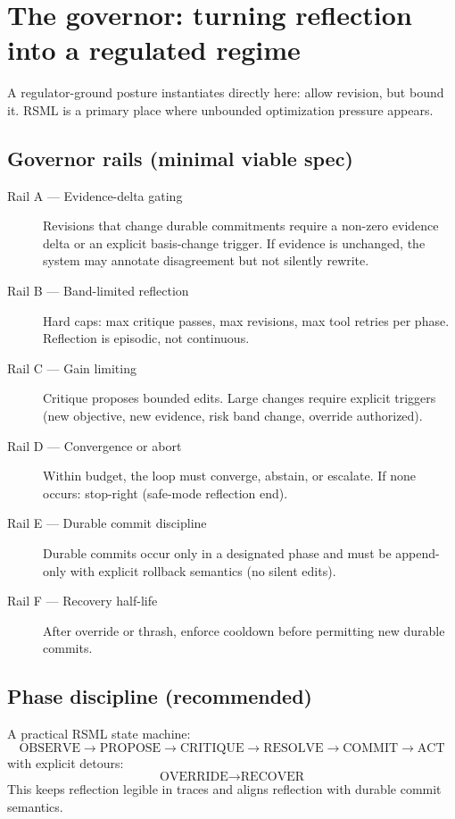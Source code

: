 \documentclass[11pt]{article}
\begin{document}
\section{The governor: turning reflection into a regulated regime}
A regulator-ground posture instantiates directly here: allow revision, but bound it. RSML is a primary place
where unbounded optimization pressure appears.

\subsection{Governor rails (minimal viable spec)}
\begin{description}
  \item[Rail A — Evidence-delta gating] Revisions that change durable commitments require a non-zero evidence delta or an explicit basis-change trigger. If evidence is unchanged, the system may annotate disagreement but not silently rewrite.
  \item[Rail B — Band-limited reflection] Hard caps: max critique passes, max revisions, max tool retries per phase. Reflection is episodic, not continuous.
  \item[Rail C — Gain limiting] Critique proposes bounded edits. Large changes require explicit triggers (new objective, new evidence, risk band change, override authorized).
  \item[Rail D — Convergence or abort] Within budget, the loop must converge, abstain, or escalate. If none occurs: stop-right (safe-mode reflection end).
  \item[Rail E — Durable commit discipline] Durable commits occur only in a designated phase and must be append-only with explicit rollback semantics (no silent edits).
  \item[Rail F — Recovery half-life] After override or thrash, enforce cooldown before permitting new durable commits.
\end{description}

\subsection{Phase discipline (recommended)}
A practical RSML state machine:
\[
\text{OBSERVE} \rightarrow \text{PROPOSE} \rightarrow \text{CRITIQUE} \rightarrow \text{RESOLVE} \rightarrow \text{COMMIT} \rightarrow \text{ACT}
\]
with explicit detours:
\[
\text{OVERRIDE} \rightarrow \text{RECOVER}
\]
This keeps reflection legible in traces and aligns reflection with durable commit semantics.
\end{document}
